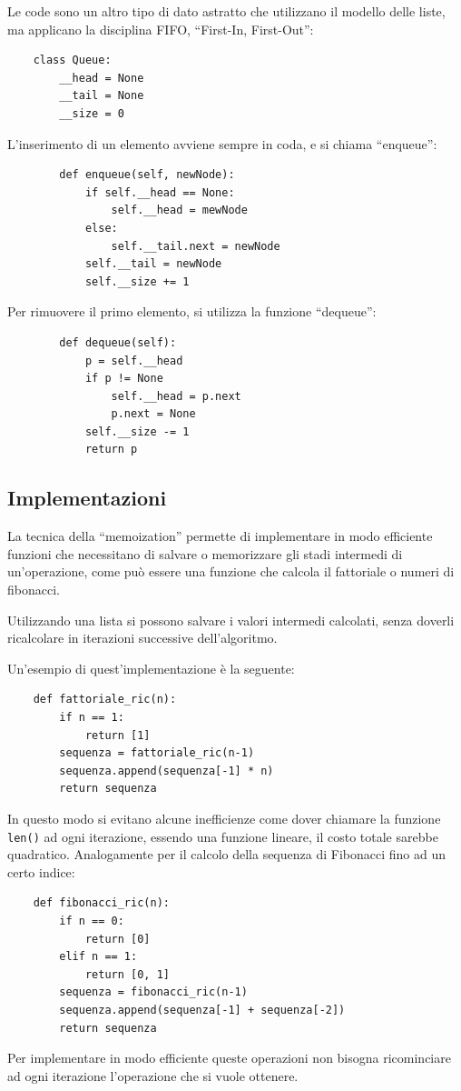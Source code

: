 \documentclass{article}
\numberwithin{equation}{subsection}
\begin{document}
Le code sono un altro tipo di dato astratto che utilizzano il modello delle liste, ma 
applicano la disciplina FIFO, ``First-In, First-Out'':
\begin{verbatim}
    class Queue:
        __head = None
        __tail = None
        __size = 0
\end{verbatim}

L'inserimento di un elemento avviene sempre in coda, e si chiama ``enqueue'':
\begin{verbatim}
        def enqueue(self, newNode):
            if self.__head == None: 
                self.__head = mewNode
            else:            
                self.__tail.next = newNode
            self.__tail = newNode
            self.__size += 1 
\end{verbatim}

Per rimuovere il primo elemento, si utilizza la funzione ``dequeue'':
\begin{verbatim}
        def dequeue(self):
            p = self.__head
            if p != None
                self.__head = p.next
                p.next = None
            self.__size -= 1
            return p
\end{verbatim}

\subsection{Implementazioni}

La tecnica della ``memoization'' permette di implementare in modo efficiente funzioni che 
necessitano di salvare o memorizzare gli stadi intermedi di un'operazione, come può essere 
una funzione che calcola il fattoriale o numeri di fibonacci. 

Utilizzando una lista si possono salvare i valori intermedi calcolati, senza doverli 
ricalcolare in iterazioni successive dell'algoritmo. 

Un'esempio di quest'implementazione è la seguente:
\begin{verbatim}
    def fattoriale_ric(n):
        if n == 1:
            return [1]
        sequenza = fattoriale_ric(n-1)
        sequenza.append(sequenza[-1] * n)
        return sequenza    
\end{verbatim}
In questo modo si evitano alcune inefficienze come dover chiamare la funzione \verb|len()| ad 
ogni iterazione, essendo una funzione lineare, il costo totale sarebbe quadratico. Analogamente 
per il calcolo della sequenza di Fibonacci fino ad un certo indice:
\begin{verbatim}
    def fibonacci_ric(n):
        if n == 0:
            return [0]
        elif n == 1:
            return [0, 1]
        sequenza = fibonacci_ric(n-1)
        sequenza.append(sequenza[-1] + sequenza[-2])
        return sequenza
\end{verbatim}
Per implementare in modo efficiente queste operazioni non bisogna ricominciare ad ogni 
iterazione l'operazione che si vuole ottenere. 
\end{document}
